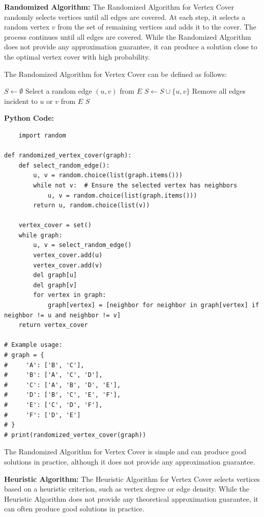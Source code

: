 \documentclass[12pt]{book} %
\begin{document}
\textbf{Randomized Algorithm:} The Randomized Algorithm for Vertex Cover randomly selects vertices until all edges are covered. At each step, it selects a random vertex \(v\) from the set of remaining vertices and adds it to the cover. The process continues until all edges are covered. While the Randomized Algorithm does not provide any approximation guarantee, it can produce a solution close to the optimal vertex cover with high probability.

The Randomized Algorithm for Vertex Cover can be defined as follows:
\FloatBarrier
\begin{algorithm}
\caption{Randomized Vertex Cover}
\begin{algorithmic}[1]
\State $S \gets \emptyset$
    \State Select a random edge $(u, v)$ from $E$
    \State $S \gets S \cup \{u, v\}$
    \State Remove all edges incident to $u$ or $v$ from $E$
\EndWhile
\State \Return $S$
\EndFunction
\end{algorithmic}
\end{algorithm}
\FloatBarrier

\textbf{Python Code:}
\FloatBarrier
\begin{lstlisting}
    import random

def randomized_vertex_cover(graph):
    def select_random_edge():
        u, v = random.choice(list(graph.items()))
        while not v:  # Ensure the selected vertex has neighbors
            u, v = random.choice(list(graph.items()))
        return u, random.choice(list(v))
    
    vertex_cover = set()
    while graph:
        u, v = select_random_edge()
        vertex_cover.add(u)
        vertex_cover.add(v)
        del graph[u]
        del graph[v]
        for vertex in graph:
            graph[vertex] = [neighbor for neighbor in graph[vertex] if neighbor != u and neighbor != v]
    return vertex_cover

# Example usage:
# graph = {
#     'A': ['B', 'C'],
#     'B': ['A', 'C', 'D'],
#     'C': ['A', 'B', 'D', 'E'],
#     'D': ['B', 'C', 'E', 'F'],
#     'E': ['C', 'D', 'F'],
#     'F': ['D', 'E']
# }
# print(randomized_vertex_cover(graph))
\end{lstlisting}
\FloatBarrier
The Randomized Algorithm for Vertex Cover is simple and can produce good solutions in practice, although it does not provide any approximation guarantee.

\textbf{Heuristic Algorithm:} The Heuristic Algorithm for Vertex Cover selects vertices based on a heuristic criterion, such as vertex degree or edge density. While the Heuristic Algorithm does not provide any theoretical approximation guarantee, it can often produce good solutions in practice.
\end{document}
